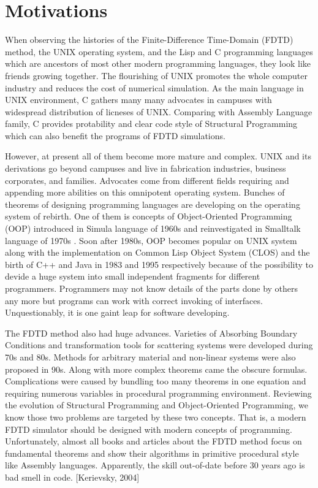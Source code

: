 \section{Motivations}
When observing the histories of the Finite-Difference Time-Domain (FDTD) method, the UNIX operating system, and the Lisp and
C programming languages which are ancestors of most other modern programming languages, they look like friends growing
together. The flourishing of UNIX promotes the whole computer industry and reduces the cost of numerical simulation. As the
main language in UNIX environment, C gathers many many advocates in campuses with widespread distribution of licneses of
UNIX. Comparing with Assembly Language family, C provides protability and clear code style of Structural Programming
which can also benefit the programs of FDTD simulations.

However, at present all of them become more mature and complex. UNIX and its derivations go beyond campuses and live in
fabrication industries, business corporates, and families. Advocates come from different fields requiring and appending
more abilities on this omnipotent operating system. Bunches of theorems of designing programming languages are developing
on the operating system of rebirth. One of them is concepts of Object-Oriented Programming (OOP) introduced in Simula
language of 1960s and reinvestigated in Smalltalk language of 1970s \cite[Sebesta 2008]{sebesta}. Soon after 1980s, OOP
becomes popular on UNIX system along with the implementation on Common Lisp Object System (CLOS) and the birth of C++
and Java in 1983 and 1995 respectively because of the possibility to devide a huge system into small independent
fragments for different programmers. Programmers may not know details of the parts done by others any more but programs
can work with correct invoking of interfaces. Unquestionably, it is one gaint leap for software developing.

The FDTD method also had huge advances. Varieties of Absorbing Boundary Conditions and transformation tools for scattering systems
were developed during 70s and 80s. Methods for arbitrary material and non-linear systems were also proposed in 90s. Along
with more complex theorems came the obscure formulas. Complications were caused by bundling too many theorems in one
equation and requiring numerous variables in procedural programming environment. Reviewing the evolution of Structural
Programming and Object-Oriented Programming, we know those two problems are targeted by these two concepts. That is, a
modern FDTD simulator should be designed with modern concepts of programming. Unfortunately, almost all books and
articles about the FDTD method focus on fundamental theorems and show their algorithms in primitive procedural style like Assembly
languages. Apparently, the skill out-of-date before 30 years ago is bad smell in code. [Kerievsky, 2004]

